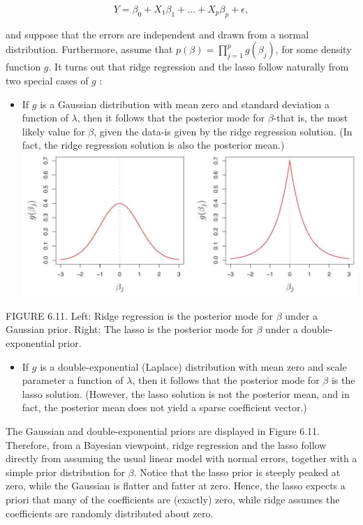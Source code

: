 \documentclass[10pt]{article}
\begin{document}
$$
Y=\beta_{0}+X_{1} \beta_{1}+\ldots+X_{p} \beta_{p}+\epsilon,
$$

and suppose that the errors are independent and drawn from a normal distribution. Furthermore, assume that $p(\beta)=\prod_{j=1}^{p} g\left(\beta_{j}\right)$, for some density function $g$. It turns out that ridge regression and the lasso follow naturally from two special cases of $g$ :

\begin{itemize}
  \item If $g$ is a Gaussian distribution with mean zero and standard deviation a function of $\lambda$, then it follows that the posterior mode for $\beta$-that is, the most likely value for $\beta$, given the data-is given by the ridge regression solution. (In fact, the ridge regression solution is also the posterior mean.)\\
\includegraphics[max width=\textwidth, center]{2025_05_05_efe77898333945044de4g-242}
\end{itemize}

FIGURE 6.11. Left: Ridge regression is the posterior mode for $\beta$ under a Gaussian prior. Right: The lasso is the posterior mode for $\beta$ under a double-exponential prior.

\begin{itemize}
  \item If $g$ is a double-exponential (Laplace) distribution with mean zero and scale parameter a function of $\lambda$, then it follows that the posterior mode for $\beta$ is the lasso solution. (However, the lasso solution is not the posterior mean, and in fact, the posterior mean does not yield a sparse coefficient vector.)
\end{itemize}

The Gaussian and double-exponential priors are displayed in Figure 6.11. Therefore, from a Bayesian viewpoint, ridge regression and the lasso follow directly from assuming the usual linear model with normal errors, together with a simple prior distribution for $\beta$. Notice that the lasso prior is steeply peaked at zero, while the Gaussian is flatter and fatter at zero. Hence, the lasso expects a priori that many of the coefficients are (exactly) zero, while ridge assumes the coefficients are randomly distributed about zero.
\end{document}
